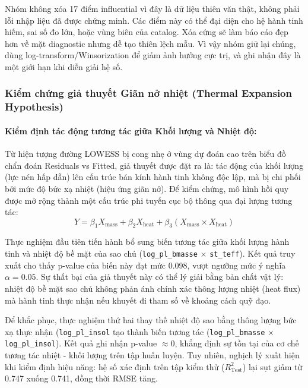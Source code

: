 Nhóm không xóa 17 điểm influential vì đây là dữ liệu thiên văn thật, không phải lỗi nhập liệu đã
được chứng minh. Các điểm này có thể đại diện cho hệ hành tinh hiếm, sai số đo lớn, hoặc vùng biên
của catalog. Xóa cứng sẽ làm báo cáo đẹp hơn về mặt diagnostic nhưng dễ tạo thiên lệch mẫu. Vì
vậy nhóm giữ lại chúng, dùng log-transform/Winsorization để giảm ảnh hưởng cực trị, và ghi nhận
đây là một giới hạn khi diễn giải hệ số.

\subsubsection{Kiểm chứng giả thuyết Giãn nở nhiệt (Thermal Expansion Hypothesis)}

\paragraph{Kiểm định tác động tương tác giữa Khối lượng và Nhiệt độ:}
Từ hiện tượng đường LOWESS bị cong nhẹ ở vùng dự đoán cao trên biểu đồ chẩn đoán Residuals vs Fitted, 
giả thuyết được đặt ra là: tác động của khối lượng (lực nén hấp dẫn) lên cấu trúc bán kính hành tinh 
không độc lập, mà bị chi phối bởi mức độ bức xạ nhiệt (hiệu ứng giãn nở). Để kiểm chứng, mô hình hồi 
quy được mở rộng thành một cấu trúc phi tuyến cục bộ thông qua đại lượng tương tác:
\begin{equation}
    Y = \beta_1 X_{\text{mass}} + \beta_2 X_{\text{heat}} + \beta_3 (X_{\text{mass}} \times X_{\text{heat}})
\end{equation}

Thực nghiệm đầu tiên tiến hành bổ sung biến tương tác giữa khối lượng hành tinh và nhiệt độ bề mặt 
của sao chủ (\texttt{log\_pl\_bmasse} $\times$ \texttt{st\_teff}). Kết quả truy xuất cho thấy p-value 
của biến này đạt mức 0.098, vượt ngưỡng mức ý nghĩa $\alpha = 0.05$. Sự thất bại của giả thuyết này 
có thể lý giải bằng bản chất vật lý: nhiệt độ bề mặt sao chủ không phản ánh chính xác thông lượng 
nhiệt (heat flux) mà hành tinh thực nhận nếu khuyết đi tham số về khoảng cách quỹ đạo.

Để khắc phục, thực nghiệm thứ hai thay thế nhiệt độ sao bằng thông lượng bức xạ thực nhận (\texttt{log\_pl\_insol} 
tạo thành biến tương tác (\texttt{log\_pl\_bmasse} $\times$ \texttt{log\_pl\_insol}). Kết quả ghi 
nhận p-value $\approx 0$, khẳng định sự tồn tại của cơ chế tương tác nhiệt - khối lượng trên tập 
huấn luyện. Tuy nhiên, nghịch lý xuất hiện khi kiểm định hiệu năng: hệ số xác định trên tập kiểm thử 
($R^2_{\text{Test}}$) lại sụt giảm từ 0.747 xuống 0.741, đồng thời RMSE tăng.

